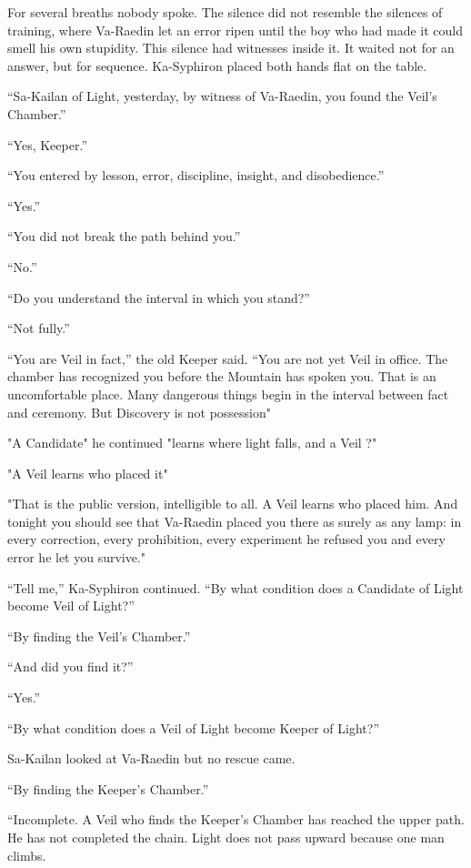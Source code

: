 For several breaths nobody spoke.
The silence did not resemble the silences of training, where Va-Raedin let an error ripen until the boy who had made it could smell his own stupidity. 
This silence had witnesses inside it. 
It waited not for an answer, but for sequence.
Ka-Syphiron placed both hands flat on the table.\par

“Sa-Kailan of Light, yesterday, by witness of Va-Raedin, you found the Veil’s Chamber.”\par
“Yes, Keeper.”\par
“You entered by lesson, error, discipline, insight, and disobedience.”\par
“Yes.”\par
“You did not break the path behind you.”\par
“No.”\par
“Do you understand the interval in which you stand?”\par
“Not fully.”\par
“You are Veil in fact,” the old Keeper said. “You are not yet Veil in office. The chamber has recognized you before the Mountain has spoken you. 
That is an uncomfortable place. Many dangerous things begin in the interval between fact and ceremony. But Discovery is not possession" \par
"A Candidate" he continued "learns where light falls, and a Veil ?"\par
"A Veil learns who placed it"\par
"That is the public version, intelligible to all. A Veil learns who placed him. 
And tonight you should see that Va-Raedin placed you there as surely as any lamp: in every correction, every prohibition, every experiment he refused you and every error he let you survive." \par
“Tell me,” Ka-Syphiron continued. “By what condition does a Candidate of Light become Veil of Light?”\par
“By finding the Veil’s Chamber.”\par
“And did you find it?”\par
“Yes.”\par
“By what condition does a Veil of Light become Keeper of Light?”\par
Sa-Kailan looked at Va-Raedin but no rescue came.\par
“By finding the Keeper’s Chamber.”\par
“Incomplete. A Veil who finds the Keeper’s Chamber has reached the upper path. He has not completed the chain. Light does not pass upward because one man climbs. 
